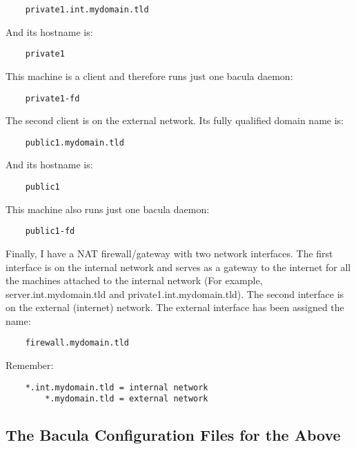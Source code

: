 \footnotesize
\begin{verbatim}
    private1.int.mydomain.tld
\end{verbatim}
\normalsize

And its hostname is:

\footnotesize
\begin{verbatim}
    private1
\end{verbatim}
\normalsize

This machine is a client and therefore runs just one bacula daemon:

\footnotesize
\begin{verbatim}
    private1-fd
\end{verbatim}
\normalsize

The second client is on the external network. Its fully qualified domain name
is:

\footnotesize
\begin{verbatim}
    public1.mydomain.tld
\end{verbatim}
\normalsize

And its hostname is:

\footnotesize
\begin{verbatim}
    public1
\end{verbatim}
\normalsize

This machine also runs just one bacula daemon:

\footnotesize
\begin{verbatim}
    public1-fd
\end{verbatim}
\normalsize

Finally, I have a NAT firewall/gateway with two network interfaces. The first
interface is on the internal network and serves as a gateway to the internet
for all the machines attached to the internal network (For example,
server.int.mydomain.tld and private1.int.mydomain.tld). The second interface
is on the external (internet) network. The external interface has been
assigned the name:

\footnotesize
\begin{verbatim}
    firewall.mydomain.tld
\end{verbatim}
\normalsize

Remember:

\footnotesize
\begin{verbatim}
    *.int.mydomain.tld = internal network
        *.mydomain.tld = external network
\end{verbatim}
\normalsize

\subsection{The Bacula Configuration Files for the Above}

